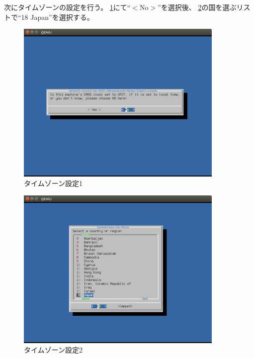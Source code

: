 \documentclass[a4j]{jarticle}
\begin{document}
次にタイムゾーンの設定を行う。
\ref{fig:FreeBSD_TIM}にて``$<$No$>$''を選択後、
\ref{fig:FreeBSD_TIM2}の国を選ぶリストで``18 Japan''を選択する。
\begin{figure}[htbp]
	\begin{center}
    	\includegraphics[width=10cm]{./IMG/FreeBSD_TIM.png}
	\end{center}
    \caption{タイムゾーン設定1}
    \label{fig:FreeBSD_TIM}
\end{figure}
\begin{figure}[htbp]
	\begin{center}
    	\includegraphics[width=10cm]{./IMG/FreeBSD_TIM_JP.png}
	\end{center}
    \caption{タイムゾーン設定2}
	\label{fig:FreeBSD_TIM2}
\end{figure}
\end{document}

